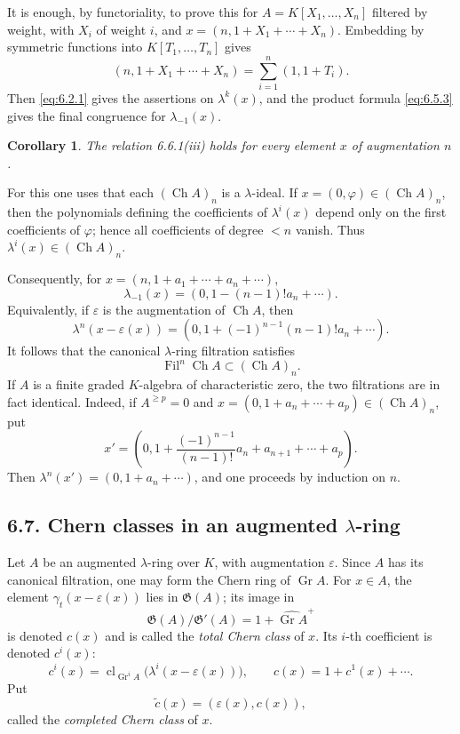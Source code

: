 \documentclass[13pt]{extarticle}
\newcommand{\Go}{\mathfrak G}
\newcommand{\Fil}{\operatorname{Fil}}
\newcommand{\Gr}{\operatorname{Gr}}
\newcommand{\cl}{\operatorname{cl}}
\newcommand{\Ch}{\operatorname{Ch}}
\newtheorem*{corollary}{Corollary}
\begin{document}
It is enough, by functoriality, to prove this for $A=K[X_1,\ldots,X_n]$ filtered by weight, with $X_i$ of weight $i$, and $x=(n,1+X_1+\cdots+X_n)$. Embedding by symmetric functions into $K[T_1,\ldots,T_n]$ gives
\[
(n,1+X_1+\cdots+X_n)=\sum_{i=1}^{n}(1,1+T_i).
\]
Then \eqref{eq:6.2.1} gives the assertions on $\lambda^k(x)$, and the product formula \eqref{eq:6.5.3} gives the final congruence for $\lambda_{-1}(x)$.

\begin{corollary}\label{cor:6.6.2}
The relation 6.6.1(iii) holds for every element $x$ of augmentation $n$.
\end{corollary}

For this one uses that each $(\Ch A)_n$ is a $\lambda$-ideal. If $x=(0,\varphi)\in(\Ch A)_n$, then the polynomials defining the coefficients of $\lambda^i(x)$ depend only on the first coefficients of $\varphi$; hence all coefficients of degree $<n$ vanish. Thus $\lambda^i(x)\in(\Ch A)_n$.

Consequently, for $x=(n,1+a_1+\cdots+a_n+\cdots)$,
\[
\lambda_{-1}(x)=(0,1-(n-1)!a_n+\cdots).
\]
Equivalently, if $\varepsilon$ is the augmentation of $\Ch A$, then
\begin{equation}\label{eq:6.6.4}
\lambda^n(x-\varepsilon(x))=(0,1+(-1)^{n-1}(n-1)!a_n+\cdots).
\end{equation}
It follows that the canonical $\lambda$-ring filtration satisfies
\begin{equation}\label{eq:6.6.5}
\Fil^n\Ch A\subset(\Ch A)_n.
\end{equation}
If $A$ is a finite graded $K$-algebra of characteristic zero, the two filtrations are in fact identical. Indeed, if $A^{\geq p}=0$ and $x=(0,1+a_n+\cdots+a_p)\in(\Ch A)_n$, put
\[
x'=\left(0,1+\frac{(-1)^{n-1}}{(n-1)!}a_n+a_{n+1}+\cdots+a_p\right).
\]
Then $\lambda^n(x')=(0,1+a_n+\cdots)$, and one proceeds by induction on $n$.

\subsection*{6.7. Chern classes in an augmented $\lambda$-ring}
Let $A$ be an augmented $\lambda$-ring over $K$, with augmentation $\varepsilon$. Since $A$ has its canonical filtration, one may form the Chern ring of $\Gr A$. For $x\in A$, the element $\gamma_t(x-\varepsilon(x))$ lies in $\Go(A)$; its image in
\[
\Go(A)/\Go'(A)=1+\widehat{\Gr A}^+
\]
is denoted $c(x)$ and is called the \emph{total Chern class} of $x$. Its $i$-th coefficient is denoted $c^i(x)$:
\begin{equation}\label{eq:6.7.1}
c^i(x)=\cl_{\Gr^iA}\bigl(\lambda^i(x-\varepsilon(x))\bigr),
\qquad
c(x)=1+c^1(x)+\cdots.
\end{equation}
Put
\begin{equation}\label{eq:6.7.2}
\widetilde c(x)=(\varepsilon(x),c(x)),
\end{equation}
called the \emph{completed Chern class} of $x$.
\end{document}
